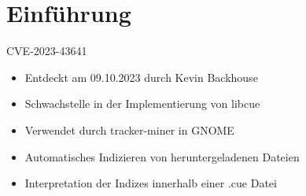 
\section{Einführung}\label{sec:einfuhrung}
\begin{frame}{CVE-2023-43641}
    \begin{itemize}
        \item Entdeckt am 09.10.2023 durch Kevin Backhouse
        \item Schwachstelle in der Implementierung von libcue
        \item Verwendet durch tracker-miner in GNOME
        \item Automatisches Indizieren von heruntergeladenen Dateien
        \item Interpretation der Indizes innerhalb einer \alert{.cue} Datei
    \end{itemize}
\end{frame}
